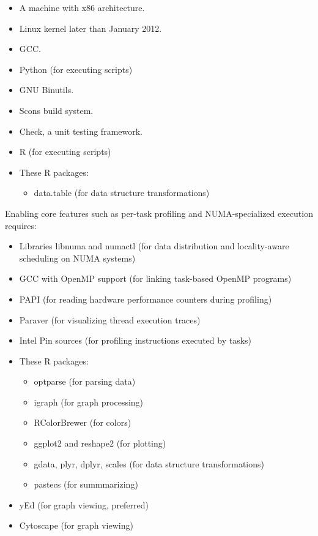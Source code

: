 \documentclass[11pt,a4paper]{article}
\begin{document}
\begin{itemize}
    \item A machine with x86 architecture.
    \item Linux kernel later than January 2012.
    \item GCC.
    \item Python (for executing scripts)
    \item GNU Binutils.
    \item Scons build system.
    \item Check, a unit testing framework.
    \item R (for executing scripts)
    \item These R packages:
    \begin{itemize}
        \item data.table (for data structure transformations)
    \end{itemize}
\end{itemize}

Enabling core features such as per-task profiling and NUMA-specialized execution requires:

\begin{itemize}
    \item Libraries libnuma and numactl (for data distribution and locality-aware scheduling on NUMA systems)
    \item GCC with OpenMP support (for linking task-based OpenMP programs)
    \item PAPI (for reading hardware performance counters during profiling)
    \item Paraver (for visualizing thread execution traces)
    \item Intel Pin sources (for profiling instructions executed by tasks)
    \item These R packages:
    \begin{itemize}
        \item optparse (for parsing data)
        \item igraph (for graph processing)
        \item RColorBrewer (for colors)
        \item ggplot2 and reshape2 (for plotting)
        \item gdata, plyr, dplyr, scales (for data structure transformations)
        \item pastecs (for summmarizing)
    \end{itemize}
    \item yEd (for graph viewing, preferred)
    \item Cytoscape (for graph viewing)
\end{itemize}
\end{document}
